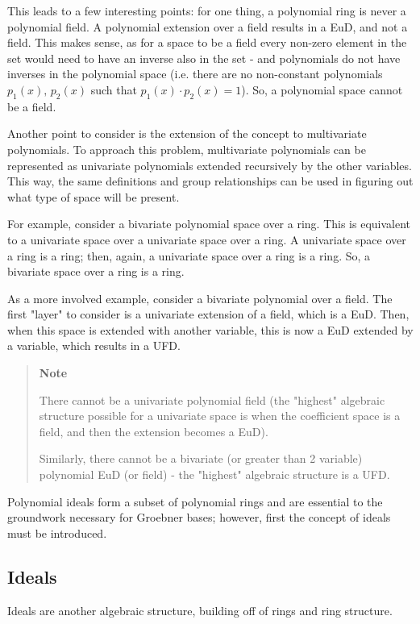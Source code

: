 \documentclass[letterpaper,12pt,titlepage,oneside,final]{book}
\newcounter{notecounter}
\newenvironment{note}{\begin{quote}%
    \refstepcounter{notecounter}%
  \textbf{Note \arabic{notecounter}}%
  \quad
}{%
\end{quote}%
}
\begin{document}
This leads to a few interesting points: for one thing, a polynomial ring is never a polynomial field.  A polynomial extension over a field results in a EuD, and not a field.  This makes sense, as for a space to be a field every non-zero element in the set would need to have an inverse also in the set - and polynomials do not have inverses in the polynomial space (i.e. there are no non-constant polynomials ${p_1(x),\, p_2(x)}$ such that ${p_1(x) \cdot p_2(x) = 1}$).  So, a polynomial space cannot be a field.

Another point to consider is the extension of the concept to multivariate polynomials.  To approach this problem, multivariate polynomials can be represented as univariate polynomials extended recursively by the other variables.  This way, the same definitions and group relationships can be used in figuring out what type of space will be present.  

For example, consider a bivariate polynomial space over a ring.  This is equivalent to a univariate space over a univariate space over a ring.  A univariate space over a ring is a ring; then, again, a univariate space over a ring is a ring.  So, a bivariate space over a ring is a ring.

As a more involved example, consider a bivariate polynomial over a field.  The first "layer" to consider is a univariate extension of a field, which is a EuD.  Then, when this space is extended with another variable, this is now a EuD extended by a variable, which results in a UFD.  

\begin{note}
  There cannot be a univariate polynomial field (the "highest" algebraic structure possible for a univariate space is when the coefficient space is a field, and then the extension becomes a EuD).
  
  Similarly, there cannot be a bivariate (or greater than 2 variable) polynomial EuD (or field) - the "highest" algebraic structure is a UFD.
\end{note}      

Polynomial ideals form a subset of polynomial rings and are essential to the groundwork necessary for Groebner bases; however, first the concept of ideals must be introduced.

\subsection{Ideals}

Ideals are another algebraic structure, building off of rings and ring structure.  
\end{document}
